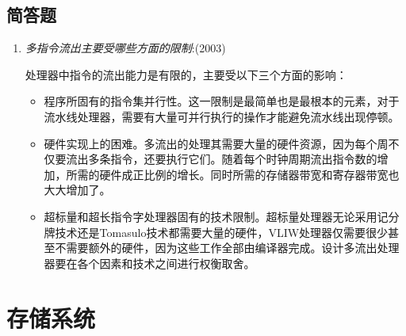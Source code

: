 \documentclass[a4paper]{ctexart}
\begin{document}
\subsection{简答题}
\begin{enumerate}
  \item \emph{多指令流出主要受哪些方面的限制}:(2003)
  
  处理器中指令的流出能力是有限的，主要受以下三个方面的影响：
  \begin{itemize}
    \item 程序所固有的指令集并行性。这一限制是最简单也是最根本的元素，对于流水线处理器，需要有大量可并行执行的操作才能避免流水线出现停顿。
    \item 硬件实现上的困难。多流出的处理其需要大量的硬件资源，因为每个周不仅要流出多条指令，还要执行它们。随着每个时钟周期流出指令数的增加，所需的硬件成正比例的增长。同时所需的存储器带宽和寄存器带宽也大大增加了。
    \item 超标量和超长指令字处理器固有的技术限制。超标量处理器无论采用记分牌技术还是Tomasulo技术都需要大量的硬件，VLIW处理器仅需要很少甚至不需要额外的硬件，因为这些工作全部由编译器完成。设计多流出处理器要在各个因素和技术之间进行权衡取舍。
  \end{itemize}
\end{enumerate}

\newpage
\section{存储系统}
\end{document}

